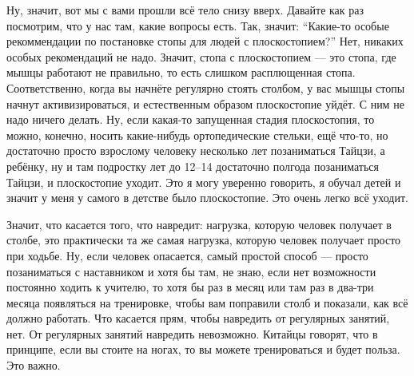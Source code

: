 Ну, значит, вот мы с вами прошли всё тело снизу вверх. Давайте как раз посмотрим, что у нас
там, какие вопросы есть. Так, значит: ``Какие-то особые рекоммендации по постановке стопы для
людей с плоскостопием?'' Нет, никаких особых рекомендаций не надо. Значит, стопа с плоскостопием
--- это стопа, где мышцы работают не правильно, то есть слишком расплющенная стопа.
Соответственно, когда вы начнёте регулярно стоять столбом, у вас мышцы стопы начнут
активизироваться, и естественным образом плоскостопие уйдёт. С ним не надо ничего делать. Ну,
если какая-то запущенная стадия плоскостопия, то можно, конечно, носить какие-нибудь
ортопедические стельки, ещё что-то, но достаточно просто взрослому человеку несколько лет
позаниматься Тайцзи, а ребёнку, ну и там подростку лет до 12--14 достаточно полгода
позаниматься Тайцзи, и плоскостопие уходит. Это я могу уверенно говорить, я обучал детей и
значит у меня у самого в детстве было плоскостопие. Это очень легко всё уходит.

Значит, что
касается того, что навредит: нагрузка, которую человек получает в столбе, это практически та же
самая
нагрузка, которую человек получает просто при ходьбе. Ну, если человек
опасается, самый простой способ --- просто позаниматься с наставником и хотя бы там, не знаю, если
нет возможности постоянно ходить к учителю, то хотя бы раз в месяц или там раз в два-три месяца
появляться на тренировке, чтобы вам поправили столб и показали, как всё должно работать.
Что касается прям, чтобы навредить от регулярных занятий, нет. От регулярных занятий навредить
невозможно. Китайцы говорят, что в принципе, если вы стоите на ногах, то вы можете
тренироваться и будет польза. Это важно.

